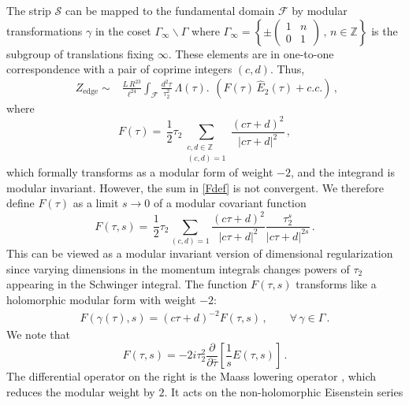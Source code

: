 \documentclass[aps,prl, reprint, superscriptaddress, 10pt]{revtex4-2}
\newcommand{\g}{\gamma}
\renewcommand{\t}{\tau}
\newcommand{\1}{\textbf{1}}
\newcommand{\+}{{\,+ \,}}
\begin{document}
The strip $\mathcal{S}$ can be mapped to the fundamental domain $\mathcal{F}$ by modular transformations $\g$ in the coset $ \Gamma_\infty\backslash\Gamma$ where $\Gamma_\infty = \left\{
\pm \left( \begin{smallmatrix}
	1 & n \\
	0 & 1 \,
\end{smallmatrix}\right) \, , \, n \in \mathbb{Z} \right\}$ is the subgroup of translations fixing $\infty$. These elements are in one-to-one correspondence with a pair of coprime integers $(c,d)$. Thus,
\begin{equation}
	\begin{split}
	Z_{\text{edge}} \sim & \frac{L\,R^{23}}{ \ell^{ 24} } \int_{\mathcal{F}} \frac{d^2\tau}{\tau_2^2}\, \Lambda (\tau) .
	\end{split} \left( F(\tau) \, \hat E_2(\tau) + c. c. \right) \, ,
\end{equation}
where
\begin{equation}\label{Fdef}
	F(\tau) = \, \frac{1}{2} \tau_2
	\sum_{\substack{c,d \in \mathbb{Z}\\(c,d)=1}}
	\dfrac{(c\tau + d)^2} {|c\tau + d|^2} \, ,
\end{equation}
which formally transforms as a modular form of weight $-2$, and the integrand is modular invariant. However, the sum in \eqref{Fdef} is not convergent. We therefore define $F(\tau)$ as a limit ${s \rightarrow 0}$ of a modular covariant function
\begin{equation}
	F(\tau, s) = \, \frac{1}{2} \tau_2
	\sum_{(c,d)=1}
	\dfrac{(c\tau + d)^2} {|c\tau + d|^2}
	\dfrac{\tau_2^s}{|c\tau + d|^{2s}} \, .
\end{equation}
This can be viewed as a modular invariant version of dimensional regularization since varying dimensions in the momentum integrals changes powers of $\tau_2$ appearing in the Schwinger integral. The function $F(\tau, s)$ transforms like a holomorphic modular form with weight $-2$:
\begin{eqnarray}
	F(\gamma(\t), s) = (c\tau + d)^{-2} F(\t, s) \, , \qquad \forall \,\gamma \in \Gamma \, .
\end{eqnarray}
We note that
\begin{equation} \label{Maass}
	F(\t, s) = -2 i \t_2^2 \frac{\partial}{\partial \bar{\tau}} \left[ \frac{1}{s} E\left( \tau, s \right) \right]\, .
\end{equation}
The differential operator on the right is the Maass lowering operator \cite{Osullivan:2018}, which reduces the modular weight by $2$. It acts on the non-holomorphic Eisenstein series
\end{document}
